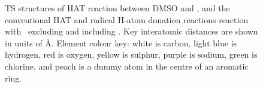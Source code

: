 \begin{doublespace}
\begin{figure}[!htbp]


\caption[TS structures of HAT reaction between DMSO and \cumo, and the
conventional HAT and radical H-atom donation reactions with \bno\ excluding and
including .]{TS structures of HAT reaction between DMSO and \cumo, and
the conventional HAT and radical H-atom donation reactions reaction with \bno\
excluding and including . Key interatomic distances are shown in units
of \AA. Element colour key: white is carbon, light blue is hydrogen, red is
oxygen, yellow is sulphur, purple is sodium, green is chlorine, and peach is a
dummy atom in the centre of an aromatic ring.}
\label{fig:dmso-ts}
\end{figure}


\end{doublespace}
